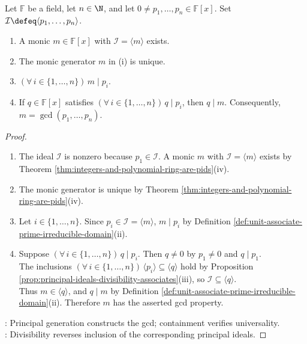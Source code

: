 \begin{corollary} \label{cor:polynomial-generated-ideal-gcd} \\
Let $\mathbb{F}$ be a field, let $n\in\N$, and let $0\neq p_1,\ldots,p_n\in\mathbb{F}[x]$. Set $\mathcal{I}\defeq\langle p_1,\ldots,p_n\rangle$.
\begin{enumerate}[label=(\roman*)]
\setlength{\itemsep}{0pt}
\item A monic $m\in\mathbb{F}[x]$ with $\mathcal{I}=\langle m\rangle$ exists.
\item The monic generator $m$ in (i) is unique.
\item $(\forall\,i\in\{1,\ldots,n\})\,m\mid p_i$.
\item If $q\in\mathbb{F}[x]$ satisfies $(\forall\,i\in\{1,\ldots,n\})\,q\mid p_i$, then $q\mid m$. Consequently, $m=\gcd(p_1,\ldots,p_n)$.
\end{enumerate}
\begin{proof}
\begin{enumerate}[label=(\roman*)]
\setlength{\itemsep}{0pt}
\item The ideal $\mathcal{I}$ is nonzero because $p_1\in\mathcal{I}$. A monic $m$ with $\mathcal{I}=\langle m\rangle$ exists by Theorem \ref{thm:integers-and-polynomial-ring-are-pids}(iv).
\item The monic generator is unique by Theorem \ref{thm:integers-and-polynomial-ring-are-pids}(iv).
\item Let $i\in\{1,\ldots,n\}$. Since $p_i\in\mathcal{I}=\langle m\rangle$, $m\mid p_i$ by Definition \ref{def:unit-associate-prime-irreducible-domain}(ii).
\item Suppose $(\forall\,i\in\{1,\ldots,n\})\,q\mid p_i$. Then $q\neq0$ by $p_1\neq0$ and $q\mid p_1$.\\
The inclusions $(\forall\,i\in\{1,\ldots,n\})\,\langle p_i\rangle\subseteq\langle q\rangle$ hold by Proposition \ref{prop:principal-ideals-divisibility-associates}(iii), so $\mathcal{I}\subseteq\langle q\rangle$.\\
Thus $m\in\langle q\rangle$, and $q\mid m$ by Definition \ref{def:unit-associate-prime-irreducible-domain}(ii). Therefore $m$ has the asserted gcd property.
\end{enumerate}
: Principal generation constructs the gcd; containment verifies universality.\\
: Divisibility reverses inclusion of the corresponding principal ideals.
\end{proof}
\end{corollary}

